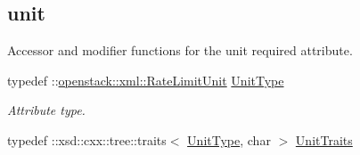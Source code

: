 \subsection*{unit}
\label{_amgrp3e34bdebd9bd5edda27e8728904a2552}
Accessor and modifier functions for the unit required attribute. \begin{DoxyCompactItemize}
\item 
\hypertarget{classopenstack_1_1xml_1_1RateLimit_a4df8c79ab8755740a6d828fd8927fc17}{
typedef ::\hyperlink{classopenstack_1_1xml_1_1RateLimitUnit}{openstack::xml::RateLimitUnit} \hyperlink{classopenstack_1_1xml_1_1RateLimit_a4df8c79ab8755740a6d828fd8927fc17}{UnitType}}
\label{classopenstack_1_1xml_1_1RateLimit_a4df8c79ab8755740a6d828fd8927fc17}

\begin{DoxyCompactList}\small\item\em Attribute type. \item\end{DoxyCompactList}\item 
\hypertarget{classopenstack_1_1xml_1_1RateLimit_a75ced76affd8beb0e27f02ffda340fbb}{
typedef ::xsd::cxx::tree::traits$<$ \hyperlink{classopenstack_1_1xml_1_1RateLimitUnit}{UnitType}, char $>$ \hyperlink{classopenstack_1_1xml_1_1RateLimit_a75ced76affd8beb0e27f02ffda340fbb}{UnitTraits}}
\label{classopenstack_1_1xml_1_1RateLimit_a75ced76affd8beb0e27f02ffda340fbb}


\end{DoxyCompactItemize}
